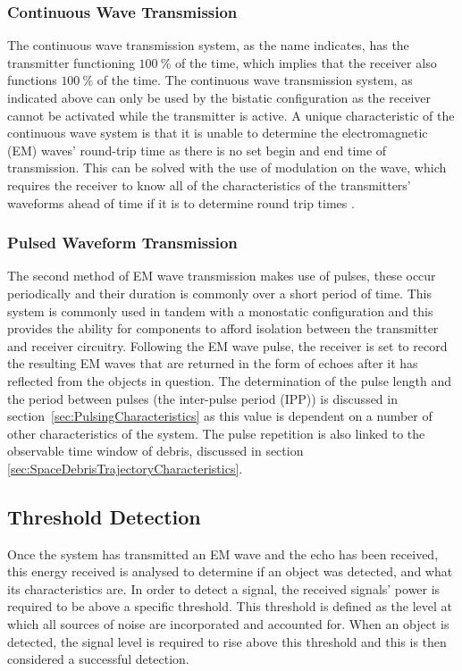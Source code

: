 \documentclass[11pt]{witseiepaper}
\begin{document}
\begin{bibunit}[witseie]
\subsubsection{Continuous Wave Transmission} \label{sec:ContinuousWaveTransmission}

The continuous wave transmission system, as the name indicates, has the transmitter functioning $100~\%$ of the time, which implies that the receiver also functions $100~\%$ of the time. The continuous wave transmission system, as indicated above can only be used by the bistatic configuration as the receiver cannot be activated while the transmitter is active.
A unique characteristic of the continuous wave system is that it is unable to determine the electromagnetic (EM) waves' round-trip time as there is no set begin and end time of transmission. This can be solved with the use of modulation on the wave, which requires the receiver to know all of the characteristics of the transmitters' waveforms ahead of time if it is to determine round trip times \cite[p.~20]{radarHandbook}.

\subsubsection{Pulsed Waveform Transmission} \label{sec:PulsedWaveformTransmission}

The second method of EM wave transmission makes use of pulses, these occur periodically and their duration is commonly over a short period of time. This system is commonly used in tandem with a monostatic configuration and this provides the ability for components to afford isolation between the transmitter and receiver circuitry.
Following the EM wave pulse, the receiver is set to record the resulting EM waves that are returned in the form of echoes after it has reflected from the objects in question. The determination of the pulse length and the period between pulses (the inter-pulse period (IPP)) is discussed in section~\ref{sec:PulsingCharacteristics} as this value is dependent on a number of other characteristics of the system. The pulse repetition is also linked to the observable time window of debris, discussed in section \ref{sec:SpaceDebrisTrajectoryCharacteristics}.


\subsection{Threshold Detection} \label{sec:ThresholdDetection}
Once the system has transmitted an EM wave and the echo has been received, this energy received is analysed to determine if an object was detected, and what its characteristics are.
In order to detect a signal, the received signals' power is required to be above a specific threshold. This threshold is defined as the level at which all sources of noise are incorporated and accounted for. When an object is detected, the signal level is required to rise above this threshold and this is then considered a successful detection.


\end{bibunit}
\end{document}
